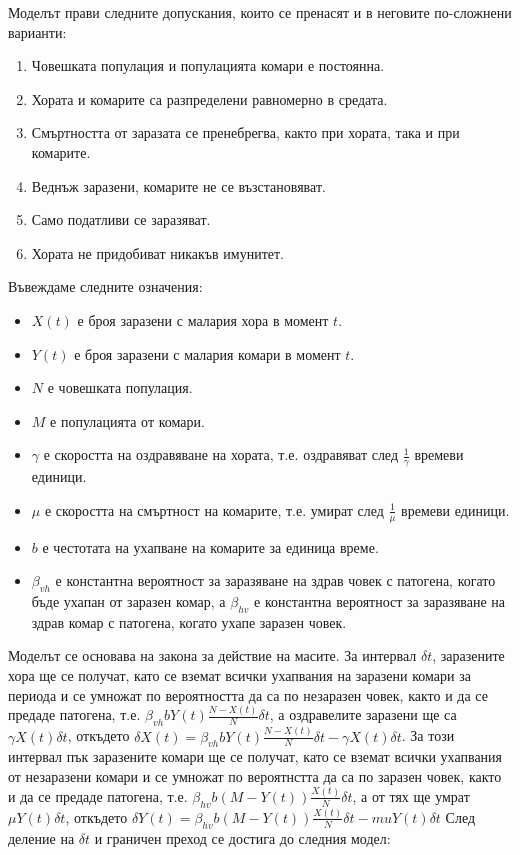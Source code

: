Моделът прави следните допускания, които се пренасят и в неговите по-сложнени варианти:
\begin{enumerate}
  \item Човешката популация и популацията комари е постоянна.
  \item Хората и комарите са разпределени равномерно в средата.
  \item Смъртността от заразата се пренебрегва, както при хората, така и при комарите.
  \item Веднъж заразени, комарите не се възстановяват.
  \item Само податливи се заразяват.
  \item Хората не придобиват никакъв имунитет.
\end{enumerate}

Въвеждаме следните означения:
\begin{itemize}
  \item $X(t)$ е броя заразени с малария хора в момент $t$.
  \item $Y(t)$ е броя заразени с малария комари в момент $t$.
  \item $N$ е човешката популация.
  \item $M$ е популацията от комари.
  \item $\gamma$ е скоростта на оздравяване на хората, т.е. оздравяват след $\frac{1}{\gamma}$ времеви единици.
  \item $\mu$ е скоростта на смъртност на комарите, т.е. умират след $\frac{1}{\mu}$ времеви единици.
  \item $b$ е честотата на ухапване на комарите за единица време.
  \item $\beta_{vh}$ е константна вероятност за заразяване на здрав човек с патогена, когато бъде ухапан от заразен комар, а $\beta_{hv}$ е константна вероятност за заразяване на здрав комар с патогена, когато ухапе заразен човек.
\end{itemize}

Моделът се основава на закона за действие на масите.
За интервал $\delta t$, заразените хора ще се получат, като се вземат всички ухапвания на заразени комари за периода и се умножат по вероятността да са по незаразен човек, както и да се предаде патогена, т.е. $\beta_{vh} b Y(t) \frac{N-X(t)}{N} \delta t$, а оздравелите заразени ще са $\gamma X(t) \delta t$, откъдето $\delta X(t) = \beta_{vh} b Y(t) \frac{N-X(t)}{N} \delta t - \gamma X(t) \delta t$.
За този интервал пък заразените комари ще се получат, като се вземат всички ухапвания от незаразени комари и се умножат по вероятнстта да са по заразен човек, както и да се предаде патогена, т.е. $\beta_{hv} b (M - Y(t)) \frac{X(t)}{N} \delta t$, а от тях ще умрат $\mu Y(t) \delta t$, откъдето $\delta Y(t) = \beta_{hv} b (M - Y(t)) \frac{X(t)}{N} \delta t - mu Y(t) \delta t$ След деление на $\delta t$ и граничен преход се достига до следния модел:

